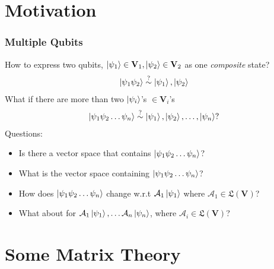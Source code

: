 \documentclass{beamer}
\theoremstyle{definition}
\newcommand{\V}{\mathbf{V}}
\newcommand{\A}{\mathcal{A}}
\begin{document}
\section{Motivation}

\begin{frame}
\frametitle{Multiple Qubits}
How to express two qubits, $\ket{\psi_1}\in \V_1, \ket{\psi_2}\in \V_2$ as one \textit{composite} state?
\begin{align*}
\left\vert{\psi_1\psi_2}\right\rangle \stackrel{?}{\sim} \left\vert{\psi_1}\right\rangle, \left\vert{\psi_2}\right\rangle
\end{align*}
What if there are more than two $\left\vert{\psi_i}\right\rangle$'s $\in \V_i$'s
\begin{align*}
\left\vert{\psi_1\psi_2\dots\psi_n}\right\rangle \stackrel{?}{\sim} \left\vert{\psi_1}\right\rangle,\left\vert{\psi_2}\right\rangle,\dots,\left\vert{\psi_n}\right\rangle?
\end{align*}
Questions:
\begin{itemize}
	\item Is there a vector space that contains $\left\vert{\psi_1\psi_2\dots\psi_n}\right\rangle$?
	\item What is the vector space containing $\left\vert{\psi_1\psi_2\dots\psi_n}\right\rangle$?
	\item How does $\left\vert{\psi_1\psi_2\dots\psi_n}\right\rangle$ change w.r.t $\A_1\ket{\psi_1}$ where $\A_1 \in \mathfrak{L}(\V)$?
	\item What about for $\A_1\ket{\psi_1},\dots\A_n\ket{\psi_n}$, where $\A_i \in \mathfrak{L}(\V)$?
\end{itemize}
\end{frame}


















\section{Some Matrix Theory}
\end{document}
